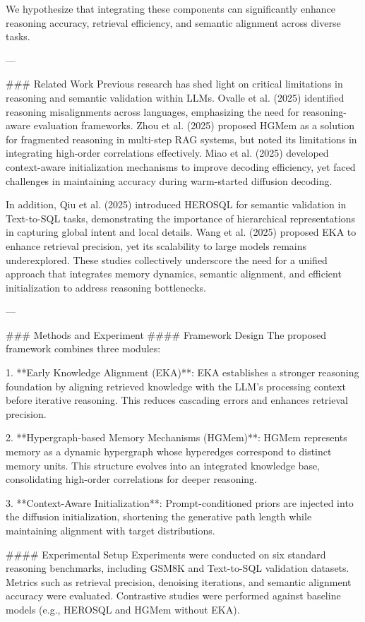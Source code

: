 We hypothesize that integrating these components can significantly enhance reasoning accuracy, retrieval efficiency, and semantic alignment across diverse tasks.

---

### Related Work  
Previous research has shed light on critical limitations in reasoning and semantic validation within LLMs. Ovalle et al. (2025) identified reasoning misalignments across languages, emphasizing the need for reasoning-aware evaluation frameworks. Zhou et al. (2025) proposed HGMem as a solution for fragmented reasoning in multi-step RAG systems, but noted its limitations in integrating high-order correlations effectively. Miao et al. (2025) developed context-aware initialization mechanisms to improve decoding efficiency, yet faced challenges in maintaining accuracy during warm-started diffusion decoding.

In addition, Qiu et al. (2025) introduced HEROSQL for semantic validation in Text-to-SQL tasks, demonstrating the importance of hierarchical representations in capturing global intent and local details. Wang et al. (2025) proposed EKA to enhance retrieval precision, yet its scalability to large models remains underexplored. These studies collectively underscore the need for a unified approach that integrates memory dynamics, semantic alignment, and efficient initialization to address reasoning bottlenecks.

---

### Methods and Experiment  
#### Framework Design  
The proposed framework combines three modules:

1. **Early Knowledge Alignment (EKA)**:  
   EKA establishes a stronger reasoning foundation by aligning retrieved knowledge with the LLM's processing context before iterative reasoning. This reduces cascading errors and enhances retrieval precision.

2. **Hypergraph-based Memory Mechanisms (HGMem)**:  
   HGMem represents memory as a dynamic hypergraph whose hyperedges correspond to distinct memory units. This structure evolves into an integrated knowledge base, consolidating high-order correlations for deeper reasoning.

3. **Context-Aware Initialization**:  
   Prompt-conditioned priors are injected into the diffusion initialization, shortening the generative path length while maintaining alignment with target distributions.

#### Experimental Setup  
Experiments were conducted on six standard reasoning benchmarks, including GSM8K and Text-to-SQL validation datasets. Metrics such as retrieval precision, denoising iterations, and semantic alignment accuracy were evaluated. Contrastive studies were performed against baseline models (e.g., HEROSQL and HGMem without EKA).

